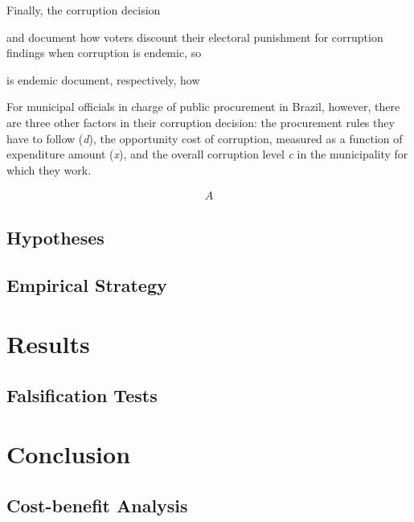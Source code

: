 \documentclass[11pt]{article}
\begin{document}
Finally, the corruption decision


\citet{FerrazExposingCorruptPoliticians2008b} and \citet{WintersLackingInformationCondoning2013} document how voters discount their electoral punishment for corruption findings when corruption is endemic, so




is endemic  \citet{ChongDoesCorruptionInformation2015} document, respectively, how






For municipal officials in charge of public procurement in Brazil, however, there are three other factors in their corruption decision: the procurement rules they have to follow (\emph{d}), the opportunity cost of corruption, measured as a function of expenditure amount (\emph{x}), and the overall corruption level \emph{c} in the municipality for which they work.

\begin{equation}
  \begin{split}
  A
  \end{split}
\end{equation}


\subsection{Hypotheses} \label{subsec:hypotheses}

\subsection{Empirical Strategy} \label{sec:methodology}

\section{Results} \label{sec:result}

\subsection{Falsification Tests} \label{subsec:discussion}

\section{Conclusion} \label{sec:conclusion}

\subsection{Cost-benefit Analysis} \label{subsec:cba}
\end{document}
